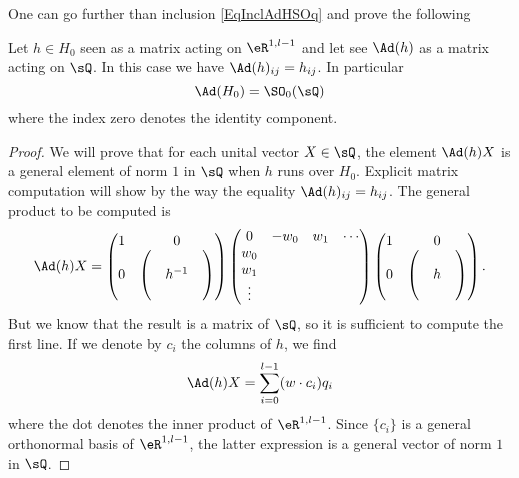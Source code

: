 One can go further than inclusion \eqref{EqInclAdHSOq} and prove the following
\begin{proposition}
	Let $h\in H_0$ seen as a matrix acting on $\eR^{1,l-1}$ and let see $\Ad(h)$ as a matrix acting on $\sQ$. In this case we have $\Ad(h)_{ij}=h_{ij}$. In particular
	\begin{equation}
		\Ad(H_0)=\SO_0(\sQ)
	\end{equation}
	where the index zero denotes the identity component.
	\label{PropSOADHequal}
\end{proposition}

\begin{proof}
	We will prove that for each unital vector $X\in\sQ$, the element $\Ad(h)X$ is a general element of norm $1$ in $\sQ$ when $h$ runs over $H_0$. Explicit matrix computation will show by the way the equality  $\Ad(h)_{ij}=h_{ij}$. The general product to be computed is
	\[
		\Ad(h)X=
		\begin{pmatrix}
			1 & 0 \\
			0 &
			\begin{pmatrix}
				 &        & \\
				 & h^{-1}   \\
				 &        &
			\end{pmatrix}
		\end{pmatrix}
		\begin{pmatrix}
			0 & -w_0 & w_1 & \cdots \\
			w_0                     \\
			w_1                     \\
			\vdots
		\end{pmatrix}
		\begin{pmatrix}
			1 & 0 \\
			0 &
			\begin{pmatrix}
				 &   & \\
				 & h   \\
				 &   &
			\end{pmatrix}
		\end{pmatrix}.
	\]
	But we know that the result is a matrix of $\sQ$, so it is sufficient to compute the first line. If we denote by $c_i$ the columns of $h$, we find
	\[
		\Ad(h)X=\sum_{i=0}^{l-1}(w\cdot c_i)q_i
	\]
	where the dot denotes the inner product of $\eR^{1,l-1}$. Since $\{ c_i \}$ is a general orthonormal basis of $\eR^{1,l-1}$, the latter expression is a general vector of norm $1$ in $\sQ$.
\end{proof}

